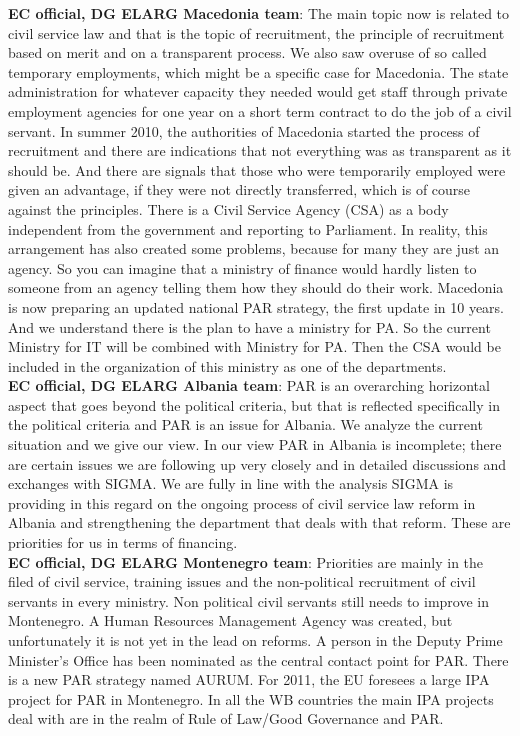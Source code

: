 \textbf{EC official, DG ELARG Macedonia team}: The main topic now is related to civil service law and that is the topic of recruitment, the principle of recruitment based on merit and on a transparent process. We also saw overuse of so called temporary employments, which might be a specific case for Macedonia. The state administration for whatever capacity they needed would get staff through private employment agencies for one year on a short term contract to do the job of a civil servant. In summer 2010, the authorities of Macedonia started the process of recruitment and there are indications that not everything was as transparent as it should be. And there are signals that those who were temporarily employed were given an advantage, if they were not directly transferred, which is of course against the principles. There is a Civil Service Agency (CSA) as a body independent from the government and reporting to Parliament. In reality, this arrangement has also created some problems, because for many they are just an agency. So you can imagine that a ministry of finance would hardly listen to someone from an agency telling them how they should do their work. Macedonia is now preparing an updated national PAR strategy, the first update in 10 years. And we understand there is the plan to have a ministry for PA. So the current Ministry for IT will be combined with Ministry for PA. Then the CSA would be included in the organization of this ministry as one of the departments. \\
\textbf{EC official, DG ELARG Albania team}: PAR is an overarching horizontal aspect that goes beyond the political criteria, but that is reflected specifically in the political criteria and PAR is an issue for Albania. We analyze the current situation and we give our view. In our view PAR in Albania is incomplete; there are certain issues we are following up very closely and in detailed discussions and exchanges with SIGMA. We are fully in line with the analysis SIGMA is providing in this regard on the ongoing process of civil service law reform in Albania and strengthening the department that deals with that reform. These are priorities for us in terms of financing.\\
\textbf{EC official, DG ELARG Montenegro team}: Priorities are mainly in the filed of civil service, training issues and the non-political recruitment of civil servants in every ministry. Non political civil servants still needs to improve in Montenegro. A Human Resources Management Agency was created, but unfortunately it is not yet in the lead on reforms. A person in the Deputy Prime Minister's Office has been nominated as the central contact point for PAR. There is a new PAR strategy named AURUM. For 2011, the EU foresees a large IPA project for PAR in Montenegro. In all the WB countries the main IPA projects deal with are in the realm of Rule of Law/Good Governance and PAR. \\
